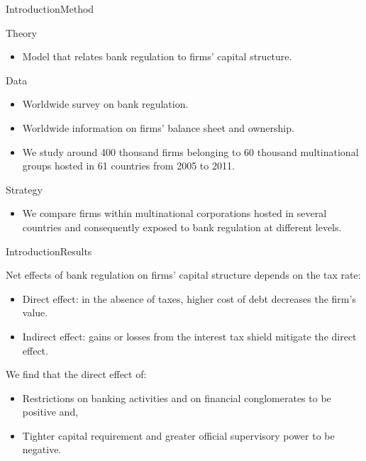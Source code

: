 \documentclass{beamer}
\begin{document}
\begin{frame}{Introduction}{Method}

Theory
\begin{itemize}
	\item Model that relates bank regulation to firms' capital structure.	
\end{itemize}
\vspace{\baselineskip}
Data
\begin{itemize}
	\item Worldwide survey on bank regulation.
	\item Worldwide information on firms' balance sheet and ownership.
	\item We study around 400 thousand firms belonging to 60 thousand multinational groups hosted in 61 countries from 2005 to 2011.	
\end{itemize}
	\vspace{\baselineskip}
	Strategy
\begin{itemize}
	\item We compare firms within multinational corporations hosted in several countries
	and consequently exposed to bank regulation at different levels. 
	
	
\end{itemize}




 
\end{frame}

\begin{frame}{Introduction}{Results}

 Net effects of bank regulation on firms' capital structure depends on the tax rate: \\
\begin{itemize}
	
	\item Direct effect: in the absence of taxes, higher cost of debt decreases the firm's value.
	\item Indirect effect: gains or losses from the interest tax shield mitigate the direct effect.
\end{itemize}
\vspace{\baselineskip}
We find that the direct effect of:
\begin{itemize}
	\item Restrictions on banking activities and on financial conglomerates to be positive and,
	\item	Tighter capital requirement and greater official supervisory power to be negative.
	
\end{itemize}

\end{frame}
\end{document}
